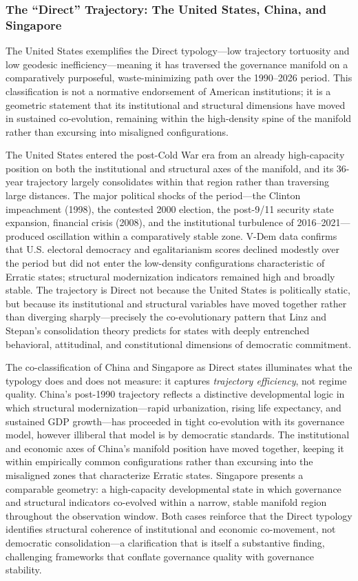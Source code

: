 \documentclass[12pt]{article}
\begin{document}
\subsubsection{The ``Direct'' Trajectory: The United States, China, and Singapore}

The United States exemplifies the Direct typology---low trajectory tortuosity and low geodesic inefficiency---meaning it has traversed the governance manifold on a comparatively purposeful, waste-minimizing path over the 1990--2026 period. This classification is not a normative endorsement of American institutions; it is a geometric statement that its institutional and structural dimensions have moved in sustained co-evolution, remaining within the high-density spine of the manifold rather than excursing into misaligned configurations.

The United States entered the post-Cold War era from an already high-capacity position on both the institutional and structural axes of the manifold, and its 36-year trajectory largely consolidates within that region rather than traversing large distances. The major political shocks of the period---the Clinton impeachment (1998), the contested 2000 election, the post-9/11 security state expansion, financial crisis (2008), and the institutional turbulence of 2016--2021---produced oscillation within a comparatively stable zone. V-Dem data confirms that U.S. electoral democracy and egalitarianism scores declined modestly over the period but did not enter the low-density configurations characteristic of Erratic states; structural modernization indicators remained high and broadly stable. The trajectory is Direct not because the United States is politically static, but because its institutional and structural variables have moved together rather than diverging sharply---precisely the co-evolutionary pattern that Linz and Stepan's \cite{linzstepan1996} consolidation theory predicts for states with deeply entrenched behavioral, attitudinal, and constitutional dimensions of democratic commitment.

The co-classification of China and Singapore as Direct states illuminates what the typology does and does not measure: it captures \textit{trajectory efficiency}, not regime quality. China's post-1990 trajectory reflects a distinctive developmental logic in which structural modernization---rapid urbanization, rising life expectancy, and sustained GDP growth---has proceeded in tight co-evolution with its governance model, however illiberal that model is by democratic standards. The institutional and economic axes of China's manifold position have moved together, keeping it within empirically common configurations rather than excursing into the misaligned zones that characterize Erratic states. Singapore presents a comparable geometry: a high-capacity developmental state in which governance and structural indicators co-evolved within a narrow, stable manifold region throughout the observation window. Both cases reinforce that the Direct typology identifies structural coherence of institutional and economic co-movement, not democratic consolidation---a clarification that is itself a substantive finding, challenging frameworks that conflate governance quality with governance stability.
\end{document}

